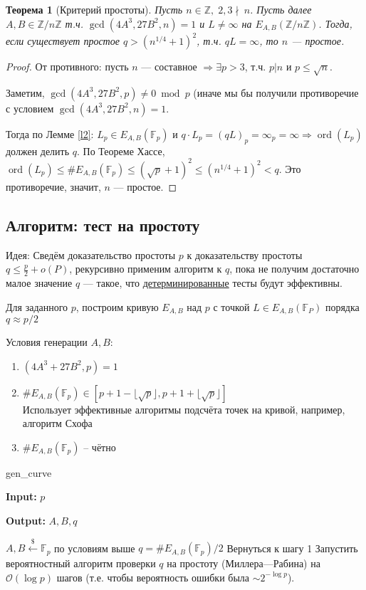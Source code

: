 \documentclass[12pt]{article}
\newcommand{\Z}{{{\mathbb Z}}}
\newcommand{\F}{{{\mathbb F}}}
\newcommand{\bigO}{\mathcal{O}}
\newtheorem{theorem}{Теорема}
\theoremstyle{definition}
\theoremstyle{definition}
\theoremstyle{definition}
\begin{document}
\begin{theorem}[Критерий простоты]
\label{t3}
    Пусть $n \in \Z,\; 2,3 \nmid \ n$. Пусть далее $A, B \in \Z/n\Z$ т.ч. $\gcd(4A^3, 27B^2, n) =1$ и $L \neq \infty$ на $E_{A,B}(\Z/n\Z)$. Тогда, если существует простое $q > (n^{1/4} + 1)^2$, т.ч. $qL = \infty$, то $n$ — простое. 
\end{theorem}
\begin{proof}
    От противного: пусть $n$ — составное $\Rightarrow \exists p > 3$, т.ч. $p | n$ и $p \leq \sqrt{n}$.
    
    Заметим, $\gcd(4A^3, 27B^2, p) \neq 0 \bmod p$ (иначе мы бы получили противоречие с условием $\gcd(4A^3, 27B^2, n) = 1$.
    
    Тогда по Лемме \ref{l2}: $L_p \in E_{A,B}(\F_p)$ и $q\cdot L_p = (qL)_p = \infty_p = \infty \Rightarrow \operatorname{ord}(L_p)$ должен делить $q$.
    По Теореме Хассе, $\operatorname{ord}(L_p) \leq \#E_{A,B}(\F_p) \leq (\sqrt{p} + 1)^2 \leq (n^{1/4} + 1)^2 < q$. 
    Это противоречие, значит, $n$ — простое.
\end{proof}

\subsection{Алгоритм: тест на простоту}

Идея: Сведём доказательство простоты $p$ к доказательству простоты $q \leq \frac{p}{2} + o(P)$, рекурсивно применим алгоритм к $q$, пока не получим достаточно малое значение $q$ — такое, что \underline{детерминированные} тесты будут эффективны.

Для заданного $p$, построим кривую $E_{A,B}$ над $p$ с точкой $L \in E_{A,B}(\F_P)$ порядка $q \approx p/2$

Условия генерации $A, B$:
\begin{enumerate}[label=\alph*)]
    \item $(4A^3 + 27B^2, p) = 1$
    \item $\#E_{A,B}(\F_p) \in \left[ p+1 - \lfloor\sqrt{p}\rfloor, p + 1 + \lfloor\sqrt{p}\rfloor \right]$\\
    Использует эффективные алгоритмы подсчёта точек на кривой, например, алгоритм Схофа
    \item $\#E_{A,B}(\F_p)$ -- чётно
\end{enumerate}

\begin{algorithm}[H]
	\caption{gen\_curve}
	\label{alg:GenCurveP}
    \textbf{Input:} $p$
    
    \textbf{Output:} $A,B,q$

	\begin{algorithmic}[1]
		
		\State $A, B \xleftarrow{\$} \F_p$ по условиям выше
		\State $q = \#E_{A,B}(\F_p) / 2$
		    \State Вернуться к шагу 1  
	    \EndIf
	    \State Запустить вероятностный алгоритм проверки $q$ на простоту (Миллера—Рабина) на $\bigO(\log p)$ шагов (т.е. чтобы вероятность ошибки была $\sim 2^{-\log p}$).
	\end{algorithmic}
\end{algorithm}
\end{document}
